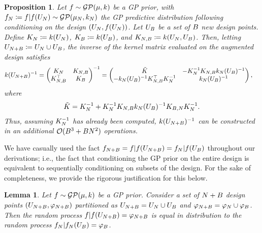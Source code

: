 \documentclass[12pt]{article}
\newtheorem{prop}{Proposition}
\newtheorem{lemma}{Lemma}
\begin{document}
\begin{prop} \label{partitioned-matrix-inverse}
Let $\func \sim \GP(\gpMeanPrior, \gpKerPrior)$ be a GP prior, with 
$\funcEm[\Ndesign] \Def \func | \func(\designIn) \sim \GP(\gpMean[\Ndesign], \gpKer[\Ndesign])$ the 
GP predictive distribution following conditioning on the design $(\designIn, \func(\designIn))$. Let 
$\designBatchIn$ be a set of $\Nbatch$ new design points. Define 
$\kerMat[\Ndesign] \Def \gpKerPrior(\designIn)$, $\kerMat[\Nbatch] \Def \gpKerPrior(\designBatchIn)$,
and $\kerMat[\Ndesign,\Nbatch] \Def \gpKerPrior(\designIn[\Ndesign], \designBatchIn)$.  
Then, letting 
$\designIn[\Naugment] \Def \designIn \cup \designBatchIn$, the inverse of the kernel matrix 
evaluated on the augmented design satisfies 
\begin{align}
\gpKerPrior(\designIn[\Naugment])^{-1}
&= \begin{pmatrix} \kerMat[\Ndesign] & \kerMat[\Ndesign,\Nbatch] \\
\kerMat[\Ndesign,\Nbatch]^\top & \kerMat[\Nbatch] \end{pmatrix}^{-1}
=  \begin{pmatrix} \tilde{K} & -\kerMat[\Ndesign]^{-1} \kerMat[\Ndesign,\Nbatch] \gpKer[\Ndesign](\designBatchIn)^{-1} \\
-\gpKer[\Ndesign](\designBatchIn)^{-1} \kerMat[\Ndesign,\Nbatch]^\top  \kerMat[\Ndesign]^{-1} & \gpKer[\Ndesign](\designBatchIn)^{-1} \end{pmatrix},
\end{align}
where 
\begin{align}
\tilde{K} = \kerMat[\Ndesign]^{-1} + \kerMat[\Ndesign]^{-1} \kerMat[\Ndesign,\Nbatch] \gpKer[\Ndesign](\designBatchIn)^{-1} \kerMat[\Nbatch,\Ndesign] \kerMat[\Ndesign]^{-1}.
\end{align}
Thus, assuming $\kerMat[\Ndesign]^{-1}$ has already been computed, $\gpKerPrior(\designIn[\Naugment])^{-1}$ can be constructed in an additional 
$\BigO(\Nbatch^3 + \Nbatch \Ndesign^2)$ operations. 
\end{prop}

We have casually used the fact $\funcEm[\Naugment] = \func | \func(\designIn[\Naugment]) = \funcEm[\Ndesign] | \func(\designBatchIn)$ throughout 
our derivations; i.e., the fact that conditioning the GP prior on the entire design is equivalent to sequentially conditioning on subsets of the 
design. For the sake of completeness, we provide the rigorous justification for this below. 
\begin{lemma} \label{lemma:gp-condition-order}
Let $\func \sim \GP(\gpMeanPrior, \gpKerPrior)$ be a GP prior. Consider a set of $\Naugment$ design points $(\designIn[\Naugment], \funcVal[\Naugment])$
partitioned as $\designIn[\Naugment] = \designIn[\Ndesign] \cup \designBatchIn$ and $\funcVal[\Naugment] = \funcVal[\Ndesign] \cup \funcVal[\Nbatch]$. 
Then the random process $\func | \func(\designIn[\Naugment]) = \funcVal[\Naugment]$ is equal in distribution to the random process
$\funcEm[\Ndesign] | \funcEm[\Ndesign](\designIn[\Nbatch]) = \funcVal[\Nbatch]$. 
\end{lemma} 
\end{document}
